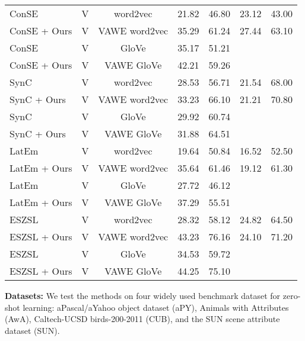 \documentclass{bmvc2k}
\begin{document}
\begin{table*}[!t]
\begin{center}
\begin{tabular}{|l|c|c|c|c|c|c|}
ConSE \cite{NorouziConse13} &V & word2vec  &21.82 & 46.80   & 23.12 & 43.00 \\
ConSE \cite{NorouziConse13} + Ours &V & VAWE word2vec &35.29 & 61.24 &27.44 & 63.10 \\
ConSE \cite{NorouziConse13} &V & GloVe  &35.17 & 51.21   &  & \\
ConSE \cite{NorouziConse13} + Ours &V & VAWE GloVe &42.21 & 59.26 & &  \\
SynC \cite{SynC2016} &V & word2vec   &28.53 &56.71  & 21.54 & 68.00  \\
SynC \cite{SynC2016} + Ours &V & VAWE word2vec  &33.23 & 66.10   & 21.21 & 70.80 \\
SynC \cite{SynC2016} &V& GloVe   &29.92 &60.74  & &   \\
SynC \cite{SynC2016} + Ours &V & VAWE GloVe   &31.88 & 64.51   &  &  \\
LatEm \cite{LatEm2016} &V & word2vec &19.64  & 50.84   & 16.52 & 52.50 \\
LatEm \cite{LatEm2016} + Ours &V & VAWE word2vec &35.64 & 61.46   & 19.12 & 61.30 \\
LatEm \cite{LatEm2016} &V & GloVe &27.72  & 46.12   &  &  \\
LatEm \cite{LatEm2016} + Ours &V & VAWE GloVe &37.29 & 55.51   &  &  \\
ESZSL \cite{Romera2015ZSL} &V & word2vec & 28.32  & 58.12   & 24.82 & 64.50 \\
ESZSL \cite{Romera2015ZSL} + Ours &V &  VAWE word2vec & 43.23  & 76.16 &24.10 & 71.20 \\
ESZSL \cite{Romera2015ZSL} &V & GloVe & 34.53  & 59.72   &  &  \\
ESZSL \cite{Romera2015ZSL} + Ours &V & VAWE GloVe & 44.25  & 75.10 & &  \\
\hline
\end{tabular}
\end{center}
\caption{ZSL classification results on 4 datasets. Blank spaces indicate these methods are not tested on the corresponding datasets. Bottom part: methods using  VAWE and the original word embeddings as semantic embeddings. Upper part: state-of-the-art methods using various sources of semantic embeddings. Visual features include V:VGG-19; G:GoogLeNet; D:DECAF; L:low-level features.}
\label{tab: zsl-all}
\end{table*}

{\bf Datasets:} We test the methods on four widely used benchmark dataset for zero-shot learning: aPascal/aYahoo object dataset \cite{Farhadi09describingobjects} (aPY), Animals with Attributes \cite{Lampert09unseen} (AwA), Caltech-UCSD birds-200-2011 \cite{CUB_200_2011} (CUB), and the SUN scene attribute dataset \cite{SUNDBijcv} (SUN). %
\end{document}
